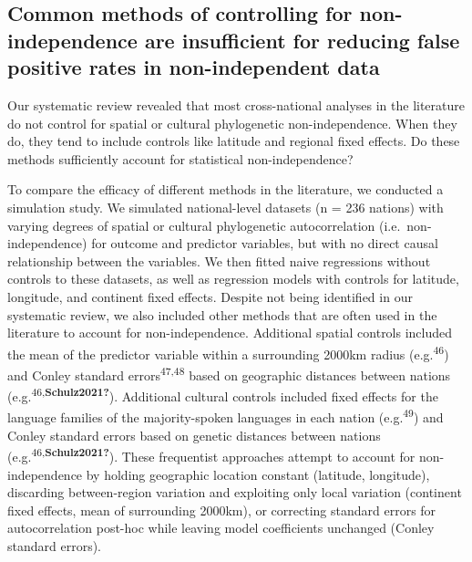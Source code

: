 \documentclass[
  man,floatsintext]{apa6}
\begin{document}
\hypertarget{common-methods-of-controlling-for-non-independence-are-insufficient-for-reducing-false-positive-rates-in-non-independent-data}{%
\subsection{Common methods of controlling for non-independence are insufficient for reducing false positive rates in non-independent data}\label{common-methods-of-controlling-for-non-independence-are-insufficient-for-reducing-false-positive-rates-in-non-independent-data}}

Our systematic review revealed that most cross-national analyses in the literature do not control for spatial or cultural phylogenetic non-independence. When they do, they tend to include controls like latitude and regional fixed effects. Do these methods sufficiently account for statistical non-independence?

To compare the efficacy of different methods in the literature, we conducted a simulation study. We simulated national-level datasets (n = 236 nations) with varying degrees of spatial or cultural phylogenetic autocorrelation (i.e.~non-independence) for outcome and predictor variables, but with no direct causal relationship between the variables. We then fitted naive regressions without controls to these datasets, as well as regression models with controls for latitude, longitude, and continent fixed effects. Despite not being identified in our systematic review, we also included other methods that are often used in the literature to account for non-independence. Additional spatial controls included the mean of the predictor variable within a surrounding 2000km radius (e.g.\textsuperscript{46}) and Conley standard errors\textsuperscript{47,48} based on geographic distances between nations (e.g.\textsuperscript{46,\textbf{Schulz2021?}}). Additional cultural controls included fixed effects for the language families of the majority-spoken languages in each nation (e.g.\textsuperscript{49}) and Conley standard errors based on genetic distances between nations (e.g.\textsuperscript{46,\textbf{Schulz2021?}}). These frequentist approaches attempt to account for non-independence by holding geographic location constant (latitude, longitude), discarding between-region variation and exploiting only local variation (continent fixed effects, mean of surrounding 2000km), or correcting standard errors for autocorrelation post-hoc while leaving model coefficients unchanged (Conley standard errors).
\end{document}
